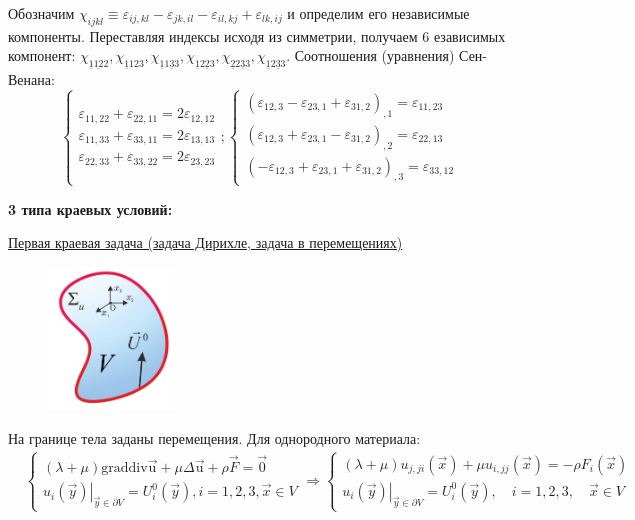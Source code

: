 Обозначим $\chi_{i j k l} \equiv \varepsilon_{i j, k l}-\varepsilon_{j k, i l}-\varepsilon_{i l, k j}+\varepsilon_{l k, i j}$ и определим его независимые компоненты. Переставляя индексы исходя из симметрии, получаем 6 езависимых компонент: $\chi_{\underline{1} \underline{12} 2}, \chi_{\underline{1} 123}, \chi_{\underline{1} 1 \underline{3} 3}, \chi_{\underline{1} 2 \underline{2} 3}, \chi_{\underline{2} 2 \underline{3} 3}, \chi_{\underline{1} 2 \underline{3} 3}$.
Соотношения
(уравнения)
Сен-Венана:
$$
\left\{\begin{array}{l}
\varepsilon_{11,22}+\varepsilon_{22,11}=2 \varepsilon_{12,12} \\
\varepsilon_{11,33}+\varepsilon_{33,11}=2 \varepsilon_{13,13} \\
\varepsilon_{22,33}+\varepsilon_{33,22}=2 \varepsilon_{23,23}
\end{array} ;\left\{\begin{array}{l}
\left(\varepsilon_{12,3}-\varepsilon_{23,1}+\varepsilon_{31,2}\right)_{, 1}=\varepsilon_{11,23} \\
\left(\varepsilon_{12,3}+\varepsilon_{23,1}-\varepsilon_{31,2}\right)_{, 2}=\varepsilon_{22,13} \\
\left(-\varepsilon_{12,3}+\varepsilon_{23,1}+\varepsilon_{31,2}\right)_{, 3}=\varepsilon_{33,12}
\end{array}\right.\right.
$$

\textbf{3 типа краевых условий:}


\underline{Первая краевая задача (задача Дирихле, задача в перемещениях)}

\begin{figure}[h!]
  \centering
  \includegraphics[width=0.3\textwidth]{images/13.2.jpg}
\end{figure}



На границе тела заданы перемещения. Для однородного материала:
$$\displaystyle
\begin{aligned} & \left\{\begin{array}{l}(\lambda+\mu) \mathrm{grad} \mathrm{div} \overrightarrow{\mathrm{u}}+\mu \Delta \overrightarrow{\mathrm{u}}+\rho \vec{F}=\overrightarrow{0} \\ \left.u_i(\vec{y})\right|_{\vec{y} \in \partial V}=U_i^0(\vec{y}), i=1,2,3, \vec{x} \in V\end{array}\right. \Rightarrow \left\{\begin{array}{l}(\lambda+\mu) u_{j, j i}(\vec{x})+\mu u_{i, j j}(\vec{x})=-\rho F_i(\vec{x}) \\ \left.u_i(\vec{y})\right|_{\vec{y} \in \partial V}=U_i^0(\vec{y}), \quad i=1,2,3, \quad \vec{x} \in V\end{array}\right.\end{aligned}$$

